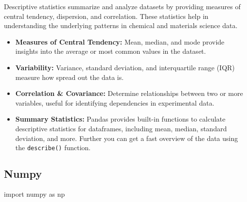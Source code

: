 \documentclass[
  letterpaper,
  DIV=11,
  numbers=noendperiod]{scrreprt}
\newenvironment{Shaded}{\begin{snugshade}}{\end{snugshade}}
\newcommand{\ImportTok}[1]{\textcolor[rgb]{0.00,0.46,0.62}{#1}}
\newcommand{\NormalTok}[1]{\textcolor[rgb]{0.00,0.23,0.31}{#1}}
\providecommand{\tightlist}{%
  \setlength{\itemsep}{0pt}\setlength{\parskip}{0pt}}\usepackage{longtable,booktabs,array}
\begin{document}

Descriptive statistics summarize and analyze datasets by providing
measures of central tendency, dispersion, and correlation. These
statistics help in understanding the underlying patterns in chemical and
materials science data.

\begin{itemize}
\tightlist
\item
  \textbf{Measures of Central Tendency:} Mean, median, and mode provide
  insights into the average or most common values in the dataset.
\item
  \textbf{Variability:} Variance, standard deviation, and interquartile
  range (IQR) measure how spread out the data is.
\item
  \textbf{Correlation \& Covariance:} Determine relationships between
  two or more variables, useful for identifying dependencies in
  experimental data.
\item
  \textbf{Summary Statistics:} Pandas provides built-in functions to
  calculate descriptive statistics for dataframes, including mean,
  median, standard deviation, and more. Further you can get a fast
  overview of the data using the \texttt{describe()} function.
\end{itemize}

\subsection*{Numpy}\label{numpy-5}

\begin{Shaded}
\begin{Highlighting}[]
\ImportTok{import}\NormalTok{ numpy }\ImportTok{as}\NormalTok{ np}
\end{Highlighting}
\end{Shaded}
\end{document}
